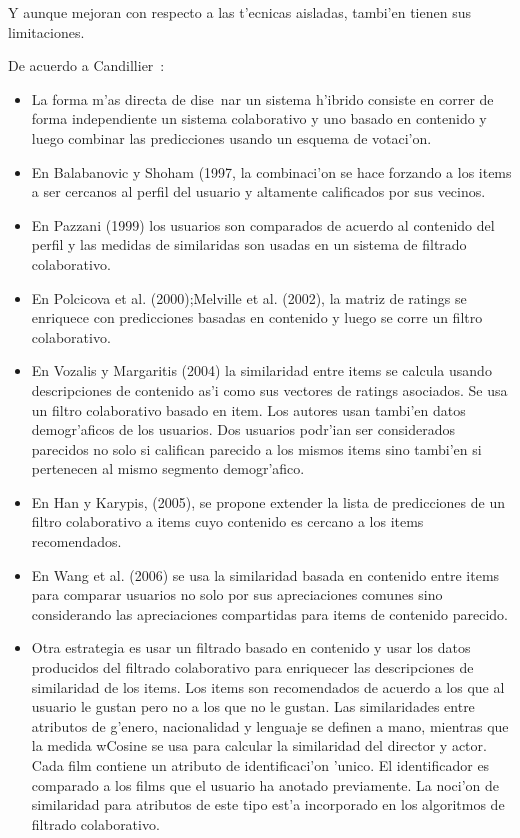 \documentclass[11pt]{article}
\begin{document}
Y aunque mejoran con respecto a las t'ecnicas aisladas, tambi'en tienen sus limitaciones.

De acuerdo a Candillier~\cite{start:candillier09}:\\
\begin{itemize}
\item La forma m'as directa de dise~nar un sistema h'ibrido consiste en correr de forma independiente un sistema colaborativo y uno basado en contenido y luego combinar las predicciones usando un esquema de votaci'on.
\item En Balabanovic y Shoham (1997, la combinaci'on se hace forzando a los items a ser cercanos al perfil del usuario y altamente calificados por sus vecinos.
\item En Pazzani (1999) los usuarios son comparados de acuerdo al contenido del perfil y las medidas de similaridas son usadas en un sistema de filtrado colaborativo.
\item En Polcicova et al. (2000);Melville et al. (2002), la matriz de ratings se enriquece con predicciones basadas en contenido y luego se corre un filtro colaborativo.
\item En Vozalis y Margaritis (2004) la similaridad entre items se calcula usando descripciones de contenido as'i como sus vectores de ratings asociados. Se usa un filtro colaborativo basado en item. Los autores usan tambi'en datos demogr'aficos de los usuarios. Dos usuarios podr'ian ser considerados parecidos no solo si califican parecido a los mismos items sino tambi'en si pertenecen al mismo segmento demogr'afico.
\item En Han y Karypis, (2005), se propone extender la lista de predicciones de un filtro colaborativo a items cuyo contenido es cercano a los items recomendados. 
\item En Wang et al. (2006) se usa la similaridad basada en contenido entre items para comparar usuarios no solo por sus apreciaciones comunes sino considerando las apreciaciones compartidas para items de contenido parecido.
\item Otra estrategia es usar un filtrado basado en contenido y usar los datos producidos del filtrado colaborativo para enriquecer las descripciones de similaridad de los items. Los items son recomendados de acuerdo a los que al usuario le gustan pero no a los que no le gustan. Las similaridades entre atributos de g'enero, nacionalidad y lenguaje se definen a mano, mientras que la medida wCosine se usa para calcular la similaridad del director y actor. Cada film contiene un atributo de identificaci'on 'unico. El identificador es comparado a los films que el usuario ha anotado previamente. La noci'on de similaridad para atributos de este tipo est'a incorporado en los algoritmos de filtrado colaborativo.
\end{itemize}
\end{document}
